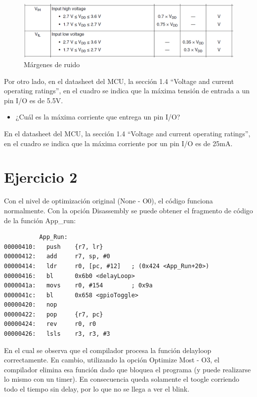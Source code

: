 \documentclass{article}
\begin{document}
\begin{figure}[ht]
	\centering
	\includegraphics[width=0.8 \textwidth]
	{../Imagenes/TablaMargenes.png}
	\caption{Márgenes de ruido}
	\label{fig:ej1}
\end{figure}

Por otro lado, en el datasheet del MCU, la sección 1.4 ``Voltage and current operating ratings'', en el cuadro se indica que la máxima tensión de entrada a un pin I/O es de 5.5V.

\begin{itemize}
\item ¿Cuál es la máxima corriente que entrega un pin I/O?
\end{itemize}
En el datasheet del MCU, la sección 1.4 ``Voltage and current operating ratings'', en el cuadro se indica que la máxima corriente por un pin I/O es de 25mA.

\newpage

\section*{Ejercicio 2}

Con el nivel de optimización original (None - O0), el código funciona normalmente. Con la opción Disassembly se puede obtener el fragmento de código de la función App\_run:

\begin{lstlisting}
          App_Run:
00000410:   push    {r7, lr}
00000412:   add     r7, sp, #0
00000414:   ldr     r0, [pc, #12]   ; (0x424 <App_Run+20>)
00000416:   bl      0x6b0 <delayLoop>
0000041a:   movs    r0, #154        ; 0x9a
0000041c:   bl      0x658 <gpioToggle>
00000420:   nop     
00000422:   pop     {r7, pc}
00000424:   rev     r0, r0
00000426:   lsls    r3, r3, #3
\end{lstlisting}

En el cual se observa que el compilador procesa la función delayloop correctamente. En cambio, utilizando la opción Optimize Most - O3, el compilador elimina esa función dado que bloquea el programa (y puede realizarse lo mismo con un timer). En consecuencia queda solamente el toogle corriendo todo el tiempo sin delay, por lo que no se llega a ver el blink.
\end{document}
